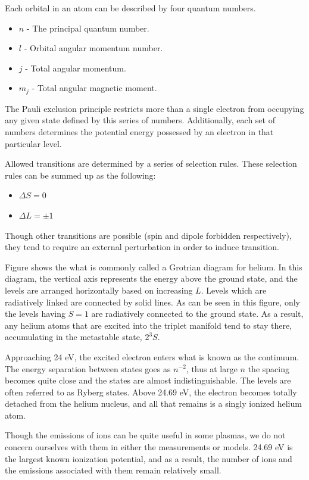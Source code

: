 Each orbital in an atom can be described by four quantum numbers.
\begin{itemize}
  \item $n$ - The principal quantum number.
  \item $l$ - Orbital angular momentum number.
  \item $j$ - Total angular momentum.
  \item $m_j$ - Total angular magnetic moment.
\end{itemize}
The Pauli exclusion principle restricts more than a single electron from
occupying any given state defined by this series of numbers.
Additionally, each set of numbers determines the potential energy
possessed by an electron in that particular level. 

Allowed transitions are determined by a series of selection rules. These
selection rules can be summed up as the following:
\begin{itemize}
    \item $\Delta S = 0$
    \item $\Delta L = \pm1$
\end{itemize}
Though other transitions are possible (spin and dipole forbidden respectively),
they tend to require an external perturbation in order to induce transition.

Figure shows the what is commonly called a Grotrian diagram for helium.
In this diagram, the vertical axis represents the energy above the
ground state, and the levels are arranged horizontally based on
increasing $L$. Levels which are radiatively linked are connected by
solid lines. As can be seen in this figure, only the levels having $S=1$
are radiatively connected to the ground state. As a result, any helium
atoms that are excited into the triplet manifold tend to stay there,
accumulating in the metastable state, $2^3S$.

Approaching 24 eV, the excited electron enters what is known as the continuum.
The energy separation between states goes as $n^{-2}$, thus at large $n$ the
spacing becomes quite close and the states are almost indistinguishable. The
levels are often referred to as Ryberg states. Above 24.69 eV, the electron
becomes totally detached from the helium nucleus, and all that remains is
a singly ionized helium atom.

Though the emissions of ions can be quite useful in some plasmas, we do not
concern ourselves with them in either the measurements or models. 24.69 eV is
the largest known ionization potential, and as a result, the number of ions and
the emissions associated with them remain relatively small.

